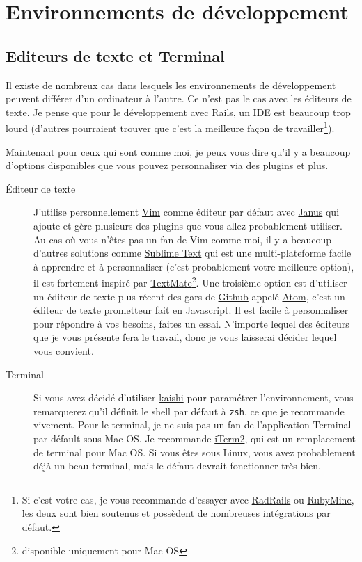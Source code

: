 \documentclass[]{report}
\begin{document}
  \section{Environnements de développement}

    \subsection{Editeurs de texte et Terminal}

      Il existe de nombreux cas dans lesquels les environnements de développement peuvent différer d'un ordinateur à l'autre. Ce n'est pas le cas avec les éditeurs de texte. Je pense que pour le développement avec Rails, un IDE est beaucoup trop lourd (d'autres pourraient trouver que c'est la meilleure façon de travailler\footnote{Si c'est votre cas, je vous recommande d'essayer avec \href{http://www.aptana.com/products/radrails}{RadRails} ou \href{http://www.jetbrains.com/ruby/index.html}{RubyMine}, les deux sont bien soutenus et possèdent de nombreuses intégrations par défaut.}).

      Maintenant pour ceux qui sont comme moi, je peux vous dire qu'il y a beaucoup d'options disponibles que vous pouvez personnaliser via des plugins et plus.

      \begin{description}
        \item[Éditeur de texte] J'utilise personnellement \href{http://www.vim.org/}{Vim} comme éditeur par défaut avec \href{https://github.com/carlhuda/janus}{Janus} qui ajoute et gère plusieurs des plugins que vous allez probablement utiliser. Au cas où vous n'êtes pas un fan de Vim comme moi, il y a beaucoup d'autres solutions comme \href{http://www.sublimetext.com/}{Sublime Text} qui est une multi-plateforme facile à apprendre et à personnaliser (c'est probablement votre meilleure option), il est fortement inspiré par \href{http://macromates.com/}{TextMate}\footnote{disponible uniquement pour Mac OS}. Une troisième option est d'utiliser un éditeur de texte plus récent des gars de \href{http://gitub.com/}{Github} appelé \href{https://atom.io/}{Atom}, c'est un éditeur de texte prometteur fait en Javascript. Il est facile à personnaliser pour répondre à vos besoins, faites un essai. N'importe lequel des éditeurs que je vous présente fera le travail, donc je vous laisserai décider lequel vous convient.

        \item[Terminal] Si vous avez décidé d'utiliser \href{http://icalialabs.github.io/kaishi/}{kaishi} pour paramétrer l'environnement, vous remarquerez qu'il définit le shell par défaut à \verb|zsh|, ce que je recommande vivement. Pour le terminal, je ne suis pas un fan de l'application Terminal par défault sous Mac OS. Je recommande \href{http://www.iterm2.com/#/section/home}{iTerm2}, qui est un remplacement de terminal pour Mac OS. Si vous êtes sous Linux, vous avez probablement déjà un beau terminal, mais le défaut devrait fonctionner très bien.
      \end{description}
\end{document}
